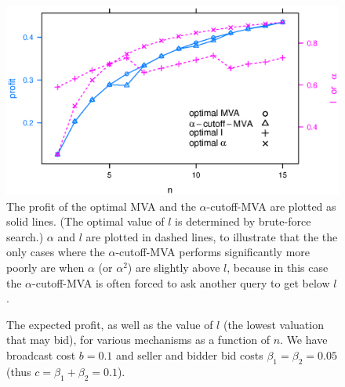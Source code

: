 \begin{figure}
\centering
    \includegraphics[width=\linewidth]{figures/cutoff_.2_.1_15.eps}
    \caption{The profit of the optimal MVA and the $\alpha$-cutoff-MVA are plotted as
    solid lines.  (The optimal value of $l$ is determined by brute-force
    search.)  $\alpha$ and $l$ are plotted in dashed lines, to illustrate
    that the the only cases where the $\alpha$-cutoff-MVA performs
    significantly more poorly are when $\alpha$ (or $\alpha^2$) are slightly
    above $l$, because in this case the $\alpha$-cutoff-MVA is often forced to
    ask another query to get below $l$.}\label{fig:cutoff}
\end{figure}

\begin{figure}
\centering
  \caption{The expected profit, as well as the value of $l$ (the lowest
    valuation that may bid), for various mechanisms as a function of $n$.
    We have
  broadcast cost $b = 0.1$ and  seller and bidder bid costs $\beta_1 =
  \beta_2 = 0.05$ (thus $c = \beta_1+\beta_2 = 0.1$).}\label{fig:general}
\end{figure}


